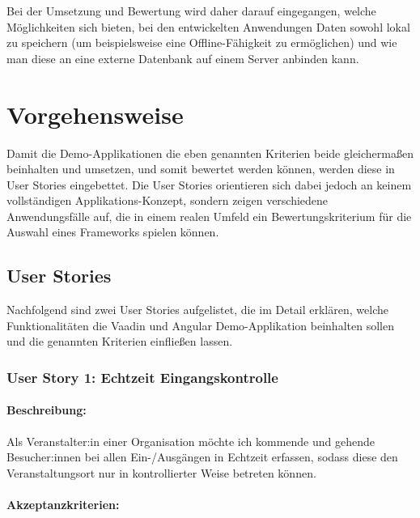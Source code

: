 \documentclass[a4paper,12pt,twoside]{scrreprt}
\begin{document}
Bei der Umsetzung und Bewertung wird daher darauf eingegangen, welche Möglichkeiten sich bieten, bei den entwickelten Anwendungen Daten sowohl lokal zu speichern (um beispielsweise eine Offline-Fähigkeit zu ermöglichen) und wie man diese an eine externe Datenbank auf einem Server anbinden kann.

\section{Vorgehensweise}
\label{sec:vorgehensweise}
Damit die Demo-Applikationen die eben genannten Kriterien beide gleichermaßen beinhalten und umsetzen, und somit bewertet werden können, werden diese in User Stories eingebettet. Die User Stories orientieren sich dabei jedoch an keinem vollständigen Applikations-Konzept, sondern zeigen verschiedene Anwendungsfälle auf, die in einem realen Umfeld ein Bewertungskriterium für die Auswahl eines Frameworks spielen können.

\subsection{User Stories}
\label{sub-sec:user-stories}
Nachfolgend sind zwei User Stories aufgelistet, die im Detail erklären, welche Funktionalitäten die Vaadin und Angular Demo-Applikation beinhalten sollen und die genannten Kriterien einfließen lassen.

\subsubsection*{User Story 1: Echtzeit Eingangskontrolle}
\label{sub-sub-sec:user-story-1}

\paragraph*{Beschreibung:} Als Veranstalter:in einer Organisation möchte ich kommende und gehende Besucher:innen bei allen Ein-/Ausgängen in Echtzeit erfassen, sodass diese den Veranstaltungsort nur in kontrollierter Weise betreten können.

\paragraph*{Akzeptanzkriterien:}
\end{document}
